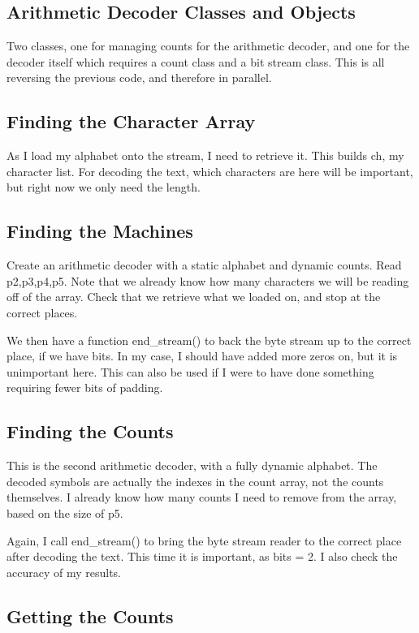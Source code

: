 \documentclass{article}
\begin{document}
\subsection{Arithmetic Decoder Classes and Objects}
Two classes, one for managing counts for the arithmetic decoder, and one for the decoder itself which requires a count class and a bit stream class. This is all reversing the previous code, and therefore in parallel.

\subsection{Finding the Character Array}

As I load my alphabet onto the stream, I need to retrieve it. This builds ch, my character list. For decoding the text, which characters are here will be important, but right now we only need the length.

\subsection{Finding the Machines}
Create an arithmetic decoder with a static alphabet and dynamic counts. Read p2,p3,p4,p5. Note that we already know how many characters we will be reading off of the array. Check that we retrieve what we loaded on, and stop at the correct places. 

We then have a function end\_stream() to back the byte stream up to the correct place, if we have bits. In my case, I should have added more zeros on, but it is unimportant here. This can also be used if I were to have done something requiring fewer bits of padding.

\subsection{Finding the Counts}

This is the second arithmetic decoder, with a fully dynamic alphabet. The decoded symbols are actually the indexes in the count array, not the counts themselves. I already know how many counts I need to remove from the array, based on the size of p5. 

Again, I call end\_stream() to bring the byte stream reader to the correct place after decoding the text. This time it is important, as bits = 2. I also check the accuracy of my results. 

\subsection{Getting the Counts}
\end{document}
